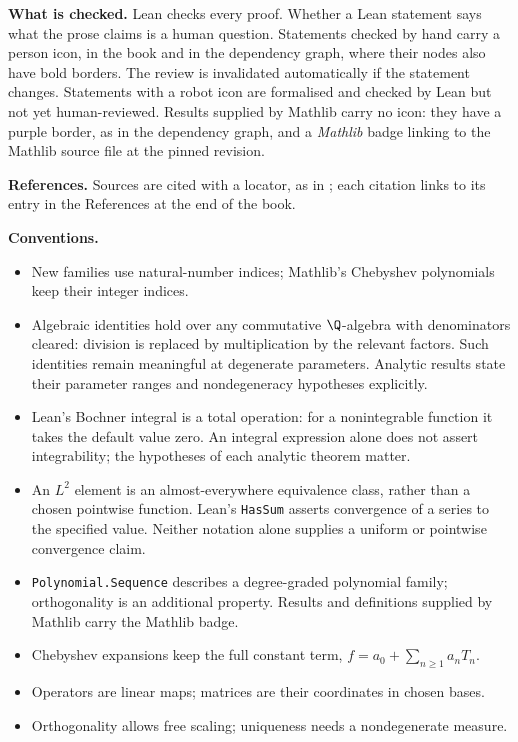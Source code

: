 \textbf{What is checked.} Lean checks every proof. Whether a Lean statement says
what the prose claims is a human question. Statements checked by hand carry a
person icon, in the book and in the dependency graph, where their nodes also have
bold borders. The review is invalidated automatically if the statement changes.
Statements with a robot icon are formalised and checked by Lean but not yet
human-reviewed. Results supplied by Mathlib carry no icon: they have a purple
border, as in the dependency graph, and a \emph{Mathlib} badge linking to the
Mathlib source file at the pinned revision.

\textbf{References.} Sources are cited with a locator, as in
\cite[Table 18.3.1]{dlmf}; each citation links to its entry in the References at
the end of the book.

\textbf{Conventions.}
\begin{itemize}
\item New families use natural-number indices; Mathlib's Chebyshev polynomials
  keep their integer indices.
\item Algebraic identities hold over any commutative $\Q$-algebra with
  denominators cleared: division is replaced by multiplication by the relevant
  factors. Such identities remain meaningful at degenerate parameters. Analytic
  results state their parameter ranges and nondegeneracy hypotheses explicitly.
\item Lean's Bochner integral is a total operation: for a nonintegrable function
  it takes the default value zero. An integral expression alone does not assert
  integrability; the hypotheses of each analytic theorem matter.
\item An $L^2$ element is an almost-everywhere equivalence class, rather than a
  chosen pointwise function. Lean's \texttt{HasSum} asserts convergence of a
  series to the specified value. Neither notation alone supplies a uniform or
  pointwise convergence claim.
\item \texttt{Polynomial.Sequence} describes a degree-graded polynomial family;
  orthogonality is an additional property. Results and definitions supplied by
  Mathlib carry the Mathlib badge.
\item Chebyshev expansions keep the full constant term, $f=a_0+\sum_{n\ge1}a_nT_n$.
\item Operators are linear maps; matrices are their coordinates in chosen bases.
\item Orthogonality allows free scaling; uniqueness needs a nondegenerate measure.
\end{itemize}

